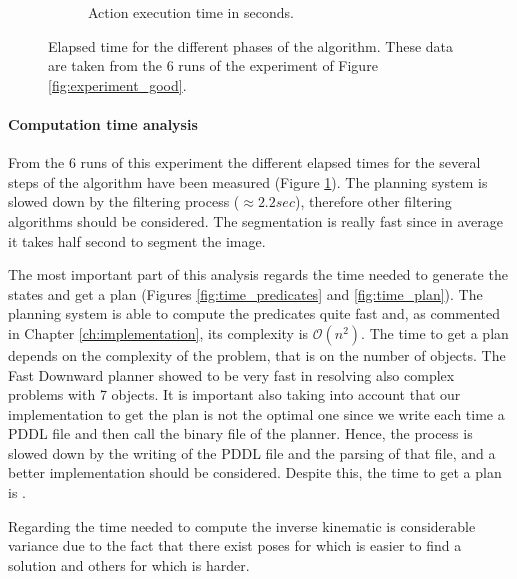 \begin{figure}[tb]
\begin{subfigure}[t]{0.45\textwidth}
\caption{Action execution time in seconds.}
\end{subfigure}
\caption{Elapsed time for the different phases of the algorithm. These data are taken from the 6 runs of the experiment of Figure \ref{fig:experiment_good}.}\label{fig:time_results}
\end{figure}


\paragraph{Computation time analysis}
From the 6 runs of this experiment the different elapsed times for the several steps of the algorithm have been measured (Figure \ref{fig:time_results}). The planning system is slowed down by the filtering process ($\approx 2.2sec$), therefore other filtering algorithms should be considered. The segmentation is really fast since in average it takes half second to segment the image.

The most important part of this analysis regards the time needed to generate the states and get a plan (Figures \ref{fig:time_predicates} and \ref{fig:time_plan}). The planning system is able to compute the predicates quite fast and, as commented in Chapter \ref{ch:implementation}, its complexity is $\mathcal{O}(n^2)$. The time to get a plan depends on the complexity of the problem, that is on the number of objects. The Fast Downward planner showed to be very fast in resolving also complex problems with 7 objects. It is important also taking into account that our implementation to get the plan is not the optimal one since we write each time a PDDL file and then call the binary file of the planner. Hence, the process is slowed down by the writing of the PDDL file and the parsing of that file, and a better implementation should be considered. Despite this, the time to get a plan is .

Regarding the time needed to compute the inverse kinematic  is  considerable  variance due to the fact that there exist poses for which is easier to find a solution and others for which is harder. 

